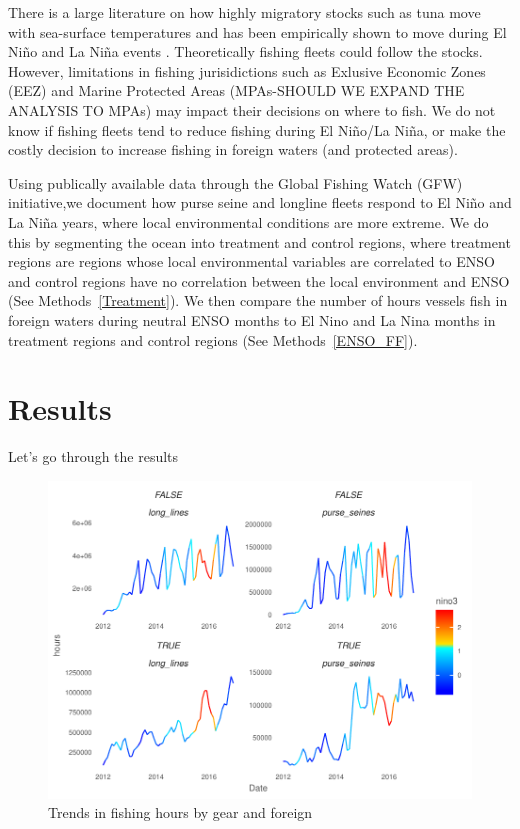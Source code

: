 \documentclass[11pt]{article}
\begin{document}
There is a large literature on how highly migratory stocks such as tuna move with sea-surface temperatures \cite{aqorau:2018} and has been empirically shown to move during El Ni\~{n}o and La Ni\~{n}a events \cite{lehodey:1997}. Theoretically fishing fleets could follow the stocks. However, limitations in fishing jurisidictions such as Exlusive Economic Zones (EEZ) and Marine Protected Areas (MPAs-SHOULD WE EXPAND THE ANALYSIS TO MPAs) may impact their decisions on where to fish. We do not know if fishing fleets tend to reduce fishing during El Ni\~{n}o/La Ni\~{n}a, or make the costly decision to increase fishing in foreign waters (and protected areas). 

Using publically available data through the Global Fishing Watch (GFW) initiative,we document how purse seine and longline fleets respond to El Ni\~{n}o and La Ni\~{n}a years, where local environmental conditions are more extreme. We do this by segmenting the ocean into treatment and control regions, where treatment regions are regions whose local environmental variables are correlated to ENSO and control regions have no correlation between the local environment and ENSO (See Methods~\ref{Treatment}). We then compare the number of hours vessels fish in foreign waters during neutral ENSO months to El Nino and La Nina months in treatment regions and control regions (See Methods~\ref{ENSO_FF}).  

\clearpage

\section{Results}
Let's go through the results

\begin{figure}
\centering
\includegraphics{../img/trends_by_gear.pdf}
\caption{Trends in fishing hours by gear and foreign}
\end{figure}
\end{document}
